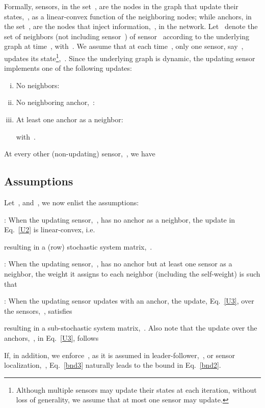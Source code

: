 \documentclass[draftclsnofoot, onecolumn, 12pt]{IEEEtran}
\begin{document}
Formally, sensors, in the set~, are the nodes in the graph that update their states,~, as a linear-convex function of the neighboring nodes; while anchors, in the set~, are the nodes that inject information,~, in the network. Let~ denote the set of neighbors (not including sensor~) of sensor~ according to the underlying graph at time~, with~. We assume that at each time~, only one sensor, say~, updates its state\footnote{Although multiple sensors may update their states at each iteration, without loss of generality, we assume that at most one sensor may update.},~. Since the underlying graph is dynamic, the updating sensor~ implements one of the following updates:
\begin{enumerate}[(i)]
\item No neighbors:

\item No neighboring anchor,~:

\item At least one anchor as a neighbor:

with~.
\end{enumerate}
At every other (non-updating) sensor,~, we have



\subsection{Assumptions} 
Let~, and~, we now enlist the assumptions:

: When the updating sensor,~, has no anchor as a neighbor, the update in Eq.~\eqref{U2} is linear-convex, i.e.

resulting in a (row) stochastic system matrix,~.

: When the updating sensor,~, has no anchor but at least one sensor as a neighbor, the weight it assigns to each neighbor (including the self-weight) is such that


: When the updating sensor updates with an anchor, the update, Eq.~\eqref{U3}, over the sensors,~, satisfies

resulting in a sub-stochastic system matrix,~. Also note that the update over the anchors,~, in Eq.~\eqref{U3}, follows

If, in addition, we enforce~, as it is assumed in leader-follower,~\cite{tanner02,4200874}, or sensor localization,~\cite{khan2009distributed,khan2010diland}, Eq.~\eqref{bnd3} naturally leads to the bound in Eq.~\eqref{bnd2}.
\end{document}
